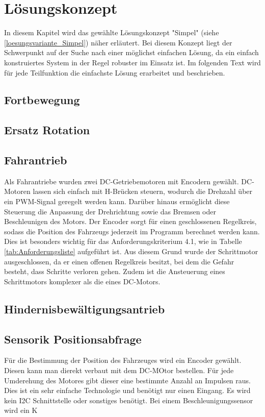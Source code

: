 \documentclass[../main.tex]{subfiles}
\begin{document}
\newpage
\section{Lösungskonzept}

In diesem Kapitel wird das gewählte Lösungskonzept "Simpel" (siehe \ref{loesungsvariante_Simpel}) näher erläutert. Bei diesem Konzept liegt der Schwerpunkt auf der Suche nach einer möglichst einfachen Lösung, da ein einfach konstruiertes System in der Regel robuster im Einsatz ist. Im folgenden Text wird für jede Teilfunktion die einfachste Lösung erarbeitet und beschrieben.

\subsection{Fortbewegung}




\subsection{Ersatz Rotation}    %




\subsection{Fahrantrieb}
Als Fahrantriebe wurden zwei DC-Getriebemotoren mit Encodern gewählt. DC-Motoren lassen sich einfach mit H-Brücken steuern, wodurch die Drehzahl über ein PWM-Signal geregelt werden kann. Darüber hinaus ermöglicht diese Steuerung die Anpassung der Drehrichtung sowie das Bremsen oder Beschleunigen des Motors. Der Encoder sorgt für einen geschlossenen Regelkreis, sodass die Position des Fahrzeugs jederzeit im Programm berechnet werden kann. Dies ist besonders wichtig für das Anforderungskriterium 4.1, wie in Tabelle \ref{tab:Anforderungsliste} aufgeführt ist. Aus diesem Grund wurde der Schrittmotor ausgeschlossen, da er einen offenen Regelkreis besitzt, bei dem die Gefahr besteht, dass Schritte verloren gehen. Zudem ist die Ansteuerung eines Schrittmotors komplexer als die eines DC-Motors.


\subsection{Hindernisbewältigungsantrieb}




\subsection{Sensorik Positionsabfrage}
Für die Bestimmung der Position des Fahrzeuges wird ein Encoder gewählt. Diesen kann man dierekt verbaut mit dem DC-MOtor bestellen. Für jede Umderehung des Motores gibt dieser eine bestimmte Anzahl an Impulsen raus. Dies ist ein sehr einfache Technologie und benötigt nur einen Eingang. Es wird kein I2C Schnittstelle oder sonstiges benötigt. Bei einem Beschleunigungssensor wird ein K
\end{document}
